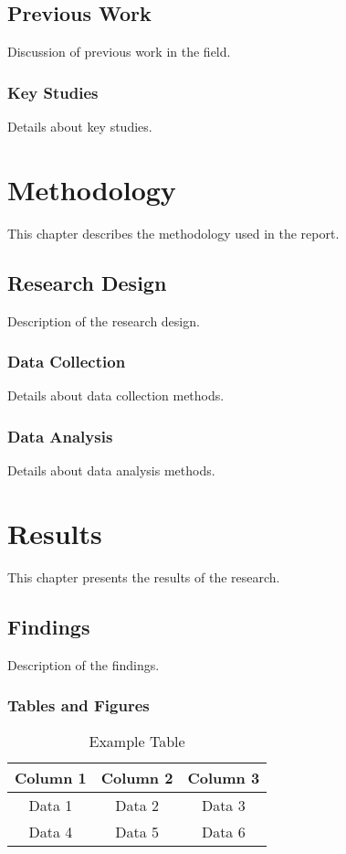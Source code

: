 \documentclass[a4paper,12pt]{report}
\begin{document}
\section{Previous Work}
Discussion of previous work in the field.

\subsection{Key Studies}
Details about key studies.

\chapter{Methodology}
This chapter describes the methodology used in the report.

\section{Research Design}
Description of the research design.

\subsection{Data Collection}
Details about data collection methods.

\subsection{Data Analysis}
Details about data analysis methods.

\chapter{Results}
This chapter presents the results of the research.

\section{Findings}
Description of the findings.

\subsection{Tables and Figures}
\begin{table}
  \centering
  \begin{tabular}{c c c}
    \toprule
    Column 1 & Column 2 & Column 3 \\
    \midrule
    Data 1   & Data 2   & Data 3   \\
    \midrule
    Data 4   & Data 5   & Data 6   \\
    \bottomrule
  \end{tabular}
  \caption{Example Table}\label{tab:example}
\end{table}
\end{document}
